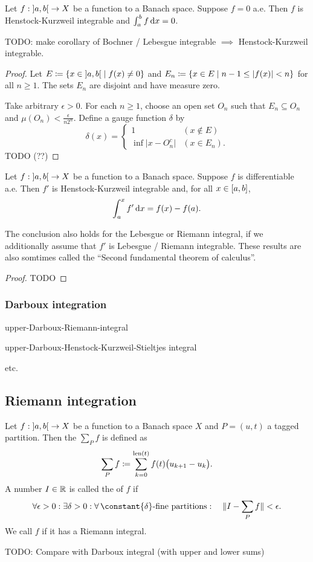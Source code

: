 \begin{proposition}
Let $f: \interval[o]{a,b}\to X$ be a function to a Banach space. Suppose $f = 0$ a.e. Then $f$ is Henstock-Kurzweil integrable and $\int_a^b f\operatorname{d \!}{x} = 0$.
\end{proposition}
TODO: make corollary of Bochner / Lebesgue integrable $\implies$ Henstock-Kurzweil integrable.
\begin{proof}
Let $E \defeq \setbuilder{x\in \interval[o]{a,b}}{f(x) \neq 0}$ and $E_n \defeq \setbuilder{x\in E}{n-1 \leq |f(x)| < n}$ for all $n \geq 1$. The sets $E_n$ are disjoint and have measure zero.

Take arbitrary $\epsilon > 0$. For each $n\geq 1$, choose an open set $O_n$ such that $E_n \subseteq O_n$ and $\mu(O_n) < \frac{\epsilon}{n2^n}$. Define a gauge function $\delta$ by
\[ \delta(x) = \begin{cases}
1 & (x\notin E) \\ \inf\big|x - O_n^c\big| & (x\in E_n).
\end{cases} \]
TODO (??)
\end{proof}

\begin{proposition} \label{secondFundamentalTheoremCalculus}
Let $f: \interval[o]{a,b}\to X$ be a function to a Banach space. Suppose $f$ is differentiable a.e. Then $f'$ is Henstock-Kurzweil integrable and, for all $x\in \interval{a,b}$,
\[ \int_a^x f' \operatorname{d \!}{x} = f(x) - f(a). \]
\end{proposition}
The conclusion also holds for the Lebesgue or Riemann integral, if we additionally assume that $f'$ is Lebesgue / Riemann integrable. These results are also somtimes called the ``Second fundamental theorem of calculus''.
\begin{proof}
TODO
\end{proof}

\subsubsection{Darboux integration}
\begin{definition}
upper-Darboux-Riemann-integral

upper-Darboux-Henstock-Kurzweil-Stieltjes integral

etc.
\end{definition}

\subsection{Riemann integration}
\begin{definition}
Let $f: \interval[o]{a,b}\to X$ be a function to a Banach space $X$ and $P = (u,t)$ a tagged partition. Then the  $\sum_P f$ is defined as
\[ \sum_P f \coloneqq \sum_{k = 0}^{\operatorname{len}(t)}f(t)\big(u_{k+1} - u_{k}\big). \]
A number $I\in \mathbb{R}$ is called the  of $f$ if
\[ \forall \epsilon >0: \exists \delta>0: \forall \,\text{$\constant{\delta}$-fine partitions}: \quad \norm{I - \sum_P f} < \epsilon. \]
We call $f$  if it has a Riemann integral.
\end{definition}
TODO: Compare with Darboux integral (with upper and lower sums)


